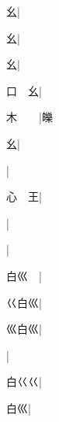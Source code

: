 \begin{multicols}{2}
{{\cjk{}{\cnsym{}　}{\cnsym{}　}幺}|{}\par
{\cjk{}{\cnsym{}　}{\cnsym{}　}幺}|{}\par
{\cjk{}{\cnsym{}　}{\cnsym{}　}幺}|{}\par
{\cjk{}口{\cnsym{}　}幺}|{}\par
{\cjk{}木{\cnsym{}　}{\cnsym{}　}}|{\cjk{}皪}\par
{\cjk{}{\cnsym{}　}{\cnsym{}　}幺}|{}\par
{}|{}\par
{\cjk{}心{\cnsym{}　}王}|{}\par
{}|{}\par
{}|{}\par
{\cjk{}白巛{\cnsym{}　}}|{}\par
{\cjk{}巜白巛}|{}\par
{\cjk{}巛白巛}|{}\par
{\cjk{}{\cnsym{}　}{\cnsym{}　}{\cnsym{}　}}|{}\par
{\cjk{}白巜巜}|{}\par
{\cjk{}{\cnsym{}　}白巛}|{}\par
}
\end{multicols}
